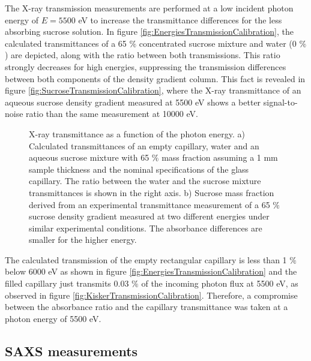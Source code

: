 The X-ray transmission measurements are performed at a low incident photon energy of $E = 5500$ eV to increase the transmittance differences for the less absorbing sucrose solution. In figure \ref{fig:EnergiesTransmissionCalibration}, the calculated transmittances of a 65 $\%$ concentrated sucrose mixture and water (0 $\%$) are depicted, along with the ratio between both transmissions. This ratio strongly decreases for high energies, suppressing the transmission differences between both components of the density gradient column. This fact is revealed in figure \ref{fig:SucroseTransmissionCalibration}, where the X-ray transmittance of an aqueous sucrose density gradient measured at 5500 eV shows a better signal-to-noise ratio than the same measurement at 10000 eV.

\begin{figure*}%
	\centering
	\caption[X-ray transmittance of the density gradient capillary at different energies.]{X-ray transmittance as a function of the photon energy. a) Calculated transmittances \citep{henke_x-ray_1993} of an empty capillary, water and an aqueous sucrose mixture with 65 $\%$ mass fraction assuming a 1 mm sample thickness and the nominal specifications of the glass capillary. The ratio between the water and the sucrose mixture transmittances is shown in the right axis. b) Sucrose mass fraction derived from an experimental transmittance measurement of a 65 $\%$ sucrose density gradient measured at two different energies under similar experimental conditions. The absorbance differences are smaller for the higher energy.}

\end{figure*}

The calculated transmission of the empty rectangular capillary is less than 1 $\%$ below 6000 eV as shown in figure \ref{fig:EnergiesTransmissionCalibration} and the filled capillary just transmits 0.03 $\%$ of the incoming photon flux at 5500 eV, as observed in figure \ref{fig:KiskerTransmissionCalibration}. Therefore, a compromise between the absorbance ratio and the capillary transmittance was taken at a photon energy of 5500 eV. 

\subsection{SAXS measurements}
\label{sec:DensityGradientSAXS}

